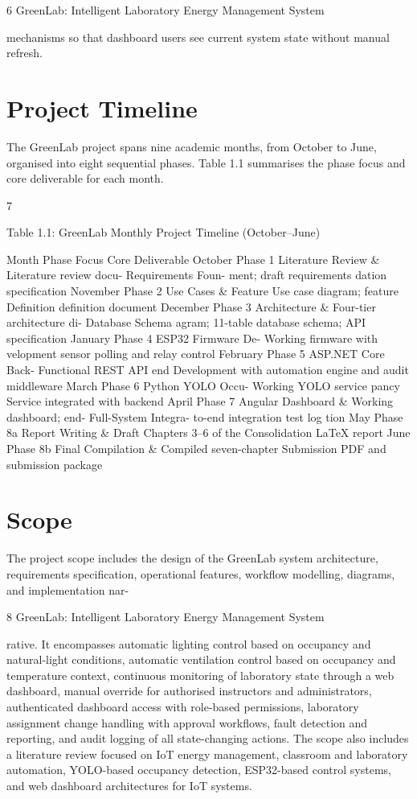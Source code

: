 6
GreenLab: Intelligent Laboratory Energy Management System


mechanisms so that dashboard users see current system state without manual refresh.




\section{Project Timeline}





The GreenLab project spans nine academic months, from October to June, organised into
eight sequential phases. Table 1.1 summarises the phase focus and core deliverable for each
month.

7


Table 1.1: GreenLab Monthly Project Timeline (October--June)

Month Phase Focus Core Deliverable
October Phase 1 Literature Review \& Literature review docu-
Requirements Foun- ment; draft requirements
dation speciﬁcation
November Phase 2 Use Cases \& Feature Use case diagram; feature
Deﬁnition deﬁnition document
December Phase 3 Architecture \& Four-tier architecture di-
Database Schema agram; 11-table database
schema; API speciﬁcation
January Phase 4 ESP32 Firmware De- Working ﬁrmware with
velopment sensor polling and relay
control
February Phase 5 ASP.NET Core Back- Functional REST API
end Development with automation engine
and audit middleware
March Phase 6 Python YOLO Occu- Working YOLO service
pancy Service integrated with backend
April Phase 7 Angular Dashboard \& Working dashboard; end-
Full-System Integra- to-end integration test log
tion
May Phase 8a Report Writing \& Draft Chapters 3--6 of the
Consolidation LaTeX report
June Phase 8b Final Compilation \& Compiled seven-chapter
Submission PDF and submission
package




\section{Scope}


The project scope includes the design of the GreenLab system architecture, requirements
speciﬁcation, operational features, workﬂow modelling, diagrams, and implementation nar-

8
GreenLab: Intelligent Laboratory Energy Management System


rative. It encompasses automatic lighting control based on occupancy and natural-light
conditions, automatic ventilation control based on occupancy and temperature context,
continuous monitoring of laboratory state through a web dashboard, manual override for
authorised instructors and administrators, authenticated dashboard access with role-based
permissions, laboratory assignment change handling with approval workﬂows, fault detection and reporting, and audit logging of all state-changing actions. The scope also includes
a literature review focused on IoT energy management, classroom and laboratory automation, YOLO-based occupancy detection, ESP32-based control systems, and web dashboard
architectures for IoT systems.

